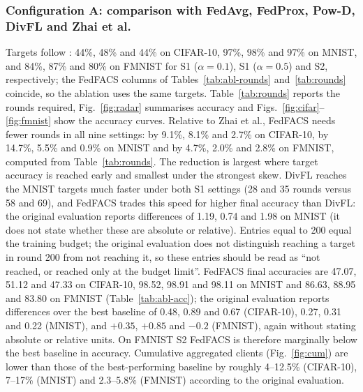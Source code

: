\documentclass[pdflatex,sn-basic]{sn-jnl}
\begin{document}
\subsubsection{Configuration A: comparison with FedAvg, FedProx, Pow-D, DivFL and Zhai et al.}
Targets follow \citet{zhai2024}: 44\%, 48\% and 44\% on CIFAR-10, 97\%, 98\% and 97\% on MNIST, and 84\%, 87\% and 80\% on FMNIST for S1 ($\alpha=0.1$), S1 ($\alpha=0.5$) and S2, respectively; the FedFACS columns of Tables~\ref{tab:abl-rounds} and~\ref{tab:rounds} coincide, so the ablation uses the same targets. Table~\ref{tab:rounds} reports the rounds required, Fig.~\ref{fig:radar} summarises accuracy and Figs.~\ref{fig:cifar}--\ref{fig:fmnist} show the accuracy curves. Relative to Zhai et al., FedFACS needs fewer rounds in all nine settings: by 9.1\%, 8.1\% and 2.7\% on CIFAR-10, by 14.7\%, 5.5\% and 0.9\% on MNIST and by 4.7\%, 2.0\% and 2.8\% on FMNIST, computed from Table~\ref{tab:rounds}. The reduction is largest where target accuracy is reached early and smallest under the strongest skew. DivFL reaches the MNIST targets much faster under both S1 settings (28 and 35 rounds versus 58 and 69), and FedFACS trades this speed for higher final accuracy than DivFL: the original evaluation reports differences of 1.19, 0.74 and 1.98 on MNIST (it does not state whether these are absolute or relative). Entries equal to 200 equal the training budget; the original evaluation does not distinguish reaching a target in round 200 from not reaching it, so these entries should be read as ``not reached, or reached only at the budget limit''. FedFACS final accuracies are 47.07, 51.12 and 47.33 on CIFAR-10, 98.52, 98.91 and 98.11 on MNIST and 86.63, 88.95 and 83.80 on FMNIST (Table~\ref{tab:abl-acc}); the original evaluation reports differences over the best baseline of 0.48, 0.89 and 0.67 (CIFAR-10), 0.27, 0.31 and 0.22 (MNIST), and $+0.35$, $+0.85$ and $-0.2$ (FMNIST), again without stating absolute or relative units. On FMNIST S2 FedFACS is therefore marginally below the best baseline in accuracy. Cumulative aggregated clients (Fig.~\ref{fig:cum}) are lower than those of the best-performing baseline by roughly 4--12.5\% (CIFAR-10), 7--17\% (MNIST) and 2.3--5.8\% (FMNIST) according to the original evaluation.
\end{document}
